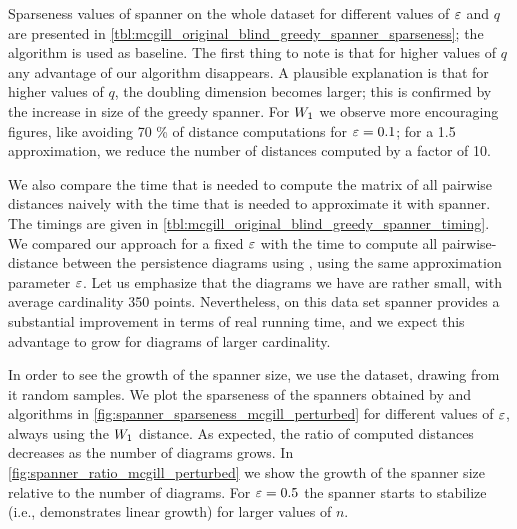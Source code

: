 Sparseness values of \bgrdy spanner on the whole  dataset
for different values of $\varepsilon$ and $q$ are presented in \cref{tbl:mcgill_original_blind_greedy_spanner_sparseness};
the \grdy algorithm is used as baseline.  The first thing to note is that for higher values of $q$
any advantage of our algorithm disappears. A plausible explanation
is that for higher values of $q$, the doubling dimension becomes larger;
this is confirmed by the increase in size of the greedy spanner.
For ${W_{1}}$ we observe more encouraging figures, like avoiding 70 \% of distance
computations for $\varepsilon = 0.1$; for a 1.5 approximation, we
reduce the number of distances computed by a factor of 10.


We also compare the time that is needed to compute the matrix of all pairwise distances
naively with the time that is needed to approximate it with \bgrdy spanner.
The timings are given in \cref{tbl:mcgill_original_blind_greedy_spanner_timing}.
We compared our approach for a fixed
$\varepsilon$ with the time to compute all pairwise-distance between the
persistence diagrams using \hera, using the same approximation parameter
$\varepsilon$. Let us emphasize that the diagrams we have are rather small,
with average cardinality
350 points. Nevertheless, on this data set \bgrdy spanner
provides a substantial improvement in terms of real running time,
and we expect this advantage to grow for diagrams of larger cardinality.



In order to see the growth of the spanner size, we use the 
dataset, drawing from it random samples.
We plot the sparseness of the spanners obtained by \grdy
and \bgrdy algorithms in \cref{fig:spanner_sparseness_mcgill_perturbed}
for different values of $\varepsilon$, always using the ${W_{1}}$ distance.
As expected, the ratio of computed distances decreases as the number of diagrams
grows. In \cref{fig:spanner_ratio_mcgill_perturbed} we show
the growth of the spanner size relative to the number of diagrams.
For $\varepsilon = 0.5$ the \bgrdy spanner starts to stabilize (i.e., demonstrates
linear growth) for larger values of $n$.


